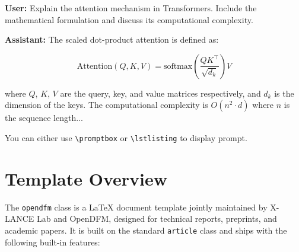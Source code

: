 \documentclass[opendfm]{xlance/xlance}
\begin{document}
\begin{promptbox}
    \textbf{User:} Explain the attention mechanism in Transformers. Include the mathematical formulation and discuss its computational complexity.

    \vspace{0.3em}
    \textbf{Assistant:} The scaled dot-product attention is defined as:

    $$\text{Attention}(Q, K, V) = \text{softmax}\!\left(\frac{QK^\top}{\sqrt{d_k}}\right)V$$

    where $Q$, $K$, $V$ are the query, key, and value matrices respectively, and $d_k$ is the dimension of the keys. The computational complexity is $O(n^2 \cdot d)$ where $n$ is the sequence length...
\end{promptbox}

\begin{notebox}
    You can either use \verb|\promptbox| or \verb|\lstlisting| to display prompt.
\end{notebox}


\section{Template Overview}
\label{section:overview}

The \texttt{opendfm} class is a \LaTeX{} document template jointly maintained by X-LANCE Lab and OpenDFM, designed for technical reports, preprints, and academic papers. It is built on the standard \texttt{article} class and ships with the following built-in features:
\end{document}
